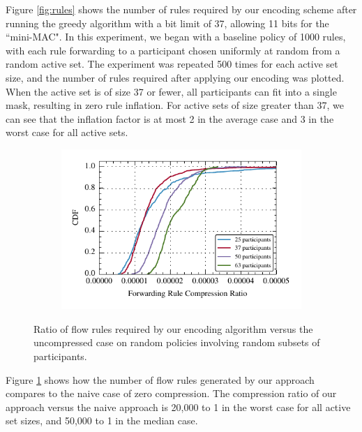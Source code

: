 Figure \ref{fig:rules} shows the number of rules required by our encoding scheme after running the greedy algorithm with a bit limit of 37, allowing 11 bits for the ``mini-MAC". In this experiment, we began with a baseline policy of 1000 rules, with each rule forwarding to a participant chosen uniformly at random from a random active set. The experiment was repeated 500 times for each active set size, and the number of rules required after applying our encoding was plotted. When the active set is of size 37 or fewer, all participants can fit into a single mask, resulting in zero rule inflation. For active sets of size greater than 37, we can see that the inflation factor is at most 2 in the average case and 3 in the worst case for all active sets. 


\begin{figure}[t!] 
\begin{minipage}{1\linewidth}
\begin{subfigure}[b]{0.96\linewidth}
\includegraphics[width=\linewidth]{figures/compression_cdf}
\end{subfigure} 
\end{minipage} 
\caption{Ratio of flow rules required by our encoding algorithm versus the uncompressed
case on random policies involving random subsets of participants.}
\label{fig:compression}
\end{figure}

Figure \ref{fig:compression} shows how the number of flow rules generated by our approach compares to the naive case of zero compression. The compression ratio of our approach versus the naive approach is 20,000 to 1 in the worst case for all active set sizes, and 50,000 to 1 in the median case.


